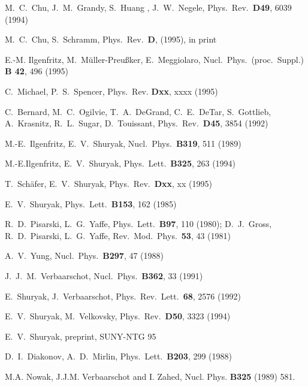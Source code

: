\begin{thebibliography}{xx}
M.~C.~Chu, J.~M.~Grandy, S.~Huang , J.~W.~Negele,
Phys.~Rev.~{\bf D49}, 6039 (1994)

M.~C.~Chu, S.~Schramm,
Phys.~Rev.~{\bf D}, (1995), in print

E.-M. Ilgenfritz, M.~M\"uller-Preu{\ss}ker, E.~Meggiolaro,
Nucl.~Phys.~(proc.~Suppl.) {\bf B 42}, 496 (1995)

C.~Michael, P.~S.~Spencer,
Phys.~Rev. {\bf Dxx}, xxxx (1995)

C.~Bernard, M.~C.~Ogilvie, T.~A.~DeGrand, C.~E.~DeTar, S.~Gottlieb,
A.~Krasnitz, R.~L.~Sugar, D.~Touissant, Phys.~Rev.~{\bf D45}, 3854
(1992)

M.-E.~Ilgenfritz, E.~V.~Shuryak,
Nucl.~Phys.~{\bf B319}, 511 (1989)

M.-E.Ilgenfritz, E.~V.~Shuryak,
Phys.~Lett.~{\bf B325}, 263 (1994)

T.~Sch\"afer, E.~V.~Shuryak,
Phys.~Rev.~{\bf Dxx}, xx (1995)

E.~V.~Shuryak,
Phys.~Lett.~{\bf B153}, 162 (1985)

R.~D.~Pisarski, L.~G.~Yaffe,
Phys.~Lett.~{\bf B97}, 110 (1980);
D.~J.~Gross, R.~D.~Pisarski, L.~G.~Yaffe,
Rev.~Mod.~Phys.~{\bf 53}, 43 (1981)

A.~V.~Yung,
Nucl.~Phys.~{\bf B297}, 47 (1988)

J.~J.~M.~Verbaarschot,
Nucl.~Phys.~{\bf B362}, 33 (1991)

E.~Shuryak, J.~Verbaarschot,
Phys.~Rev.~Lett.~{\bf 68}, 2576 (1992)

E.~V.~Shuryak, M.~Velkovsky,
Phys.~Rev.~{\bf D50}, 3323 (1994)

E.~V.~Shuryak,
preprint, SUNY-NTG 95

D.~I.~Diakonov, A.~D.~Mirlin,
Phys.~Lett.~{\bf B203}, 299 (1988)

M.A. Nowak, J.J.M. Verbaarschot and I. Zahed,
Nucl. Phys. {\bf B325} (1989) 581.


\end{thebibliography}
